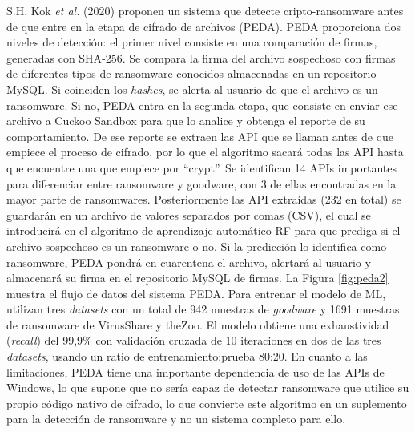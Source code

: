 S.H. Kok \textit{et al.} (2020) \cite{Kok2020} proponen un sistema que detecte cripto-ransomware antes de que entre en la etapa de cifrado de archivos (\gls{PEDA}). \gls{PEDA} proporciona dos niveles de detección: el primer nivel consiste en una comparación de firmas, generadas con \gls{SHA}-256. Se compara la firma del archivo sospechoso con firmas de diferentes tipos de ransomware conocidos almacenadas en un repositorio MySQL. Si coinciden los \textit{hashes}, se alerta al usuario de que el archivo es un ransomware. Si no, \gls{PEDA} entra en la segunda etapa, que consiste en enviar ese archivo a Cuckoo Sandbox para que lo analice y obtenga el reporte de su comportamiento. De ese reporte se extraen las \gls{API} que se llaman antes de que empiece el proceso de cifrado, por lo que el algoritmo sacará todas las \gls{API} hasta que encuentre una que empiece por ``crypt''. Se identifican 14 \gls{API}s importantes para diferenciar entre ransomware y goodware, con 3 de ellas encontradas en la mayor parte de ransomwares. Posteriormente las \gls{API} extraídas (232 en total) se guardarán en un archivo de valores separados por comas (\gls{CSV}), el cual se introducirá en el algoritmo de aprendizaje automático \gls{RF} para que prediga si el archivo sospechoso es un ransomware o no. Si la predicción lo identifica como ransomware, \gls{PEDA} pondrá en cuarentena el archivo, alertará al usuario y almacenará su firma en el repositorio MySQL de firmas. La Figura \ref{fig:peda2} muestra el flujo de datos del sistema \gls{PEDA}. Para entrenar el modelo de \gls{ML}, utilizan tres \textit{datasets} con un total de 942 muestras de \textit{goodware} y 1691 muestras de ransomware de VirusShare y theZoo. El modelo obtiene una exhaustividad (\textit{recall}) del 99,9\% con validación cruzada de 10 iteraciones en dos de las tres \textit{datasets}, usando un ratio de entrenamiento:prueba 80:20. En cuanto a las limitaciones, \gls{PEDA} tiene una importante dependencia de uso de las \gls{API}s de Windows, lo que supone que no sería capaz de detectar ransomware que utilice su propio código nativo de cifrado, lo que convierte este algoritmo en un suplemento para la detección de ransomware y no un sistema completo para ello.

